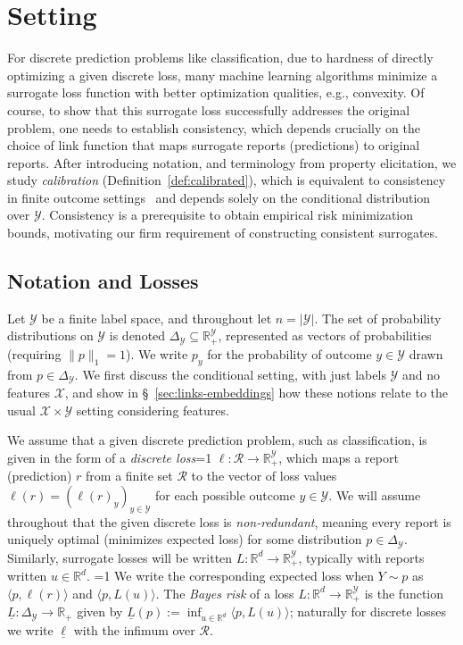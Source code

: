 \documentclass[12pt]{article}
\newcommand{\Comments}{1}
\newcommand{\mytodo}[2]{\ifnum\Comments=1%
  \todo[linecolor=#1!80!black,backgroundcolor=#1,bordercolor=#1!80!black]{#2}\fi}
\newcommand{\jessiet}[1]{\mytodo{teal!20!white}{JF: #1}}
\newcommand{\btw}[1]{\mytodo{gray!20!white}{BTW: #1}}%
\newcommand{\reals}{\mathbb{R}}
\newcommand{\simplex}{\Delta_\Y}
\newcommand{\R}{\mathcal{R}}
\newcommand{\X}{\mathcal{X}}
\newcommand{\Y}{\mathcal{Y}}
\newcommand{\risk}[1]{\underline{#1}}
\newcommand{\inprod}[2]{\langle #1, #2 \rangle}%
\begin{document}
\section{Setting}
\label{sec:setting}

For discrete prediction problems like classification, due to hardness of directly optimizing a given discrete loss, many machine learning algorithms minimize a surrogate loss function with better optimization qualities, e.g., convexity.
Of course, to show that this surrogate loss successfully addresses the original problem, one needs to establish consistency, which depends crucially on the choice of link function that maps surrogate reports (predictions) to original reports.
After introducing notation, and terminology from property elicitation, we study \emph{calibration} (Definition~\ref{def:calibrated}), which is equivalent to consistency in finite outcome settings~\citep{bartlett2006convexity,tewari2007consistency,ramaswamy2016convex} and depends solely on the conditional distribution over $\Y$.
Consistency is a prerequisite to obtain empirical risk minimization bounds, motivating our firm requirement of constructing consistent surrogates.

\subsection{Notation and Losses}
\label{sec:notation-losses}

Let $\Y$ be a finite label space, and throughout let $n=|\Y|$.
The set of probability distributions on $\Y$ is denoted $\simplex\subseteq\reals^{\Y}_+$, represented as vectors of probabilities (requiring $\|p\|_1 = 1$).
We write $p_y$ for the probability of outcome $y \in \Y$ drawn from $p \in \simplex$.
We first discuss the conditional setting, with just labels $\Y$ and no features $\X$, and show in \S~\ref{sec:links-embeddings} how these notions relate to the usual $\X\times\Y$ setting considering features.

We assume that a given discrete prediction problem, such as classification, is given in the form of a \emph{discrete loss}\jessiet{discrete vs target?} $\ell:\R\to\reals^\Y_+$, which maps a report (prediction) $r$ from a finite set $\R$ to the vector of loss values $\ell(r) = (\ell(r)_y)_{y\in\Y}$ for each possible outcome $y\in\Y$.
We will assume throughout that the given discrete loss is \emph{non-redundant}, meaning every report is uniquely optimal (minimizes expected loss) for some distribution $p\in\simplex$.
Similarly, surrogate losses will be written $L:\reals^d\to\reals^\Y_+$, typically with reports written $u\in\reals^d$.
\btw{Cut generic loss}%
We write the corresponding expected loss when $Y \sim p$ as $\inprod{p}{\ell(r)}$ and $\inprod{p}{L(u)}$.
The \emph{Bayes risk} of a loss $L:\reals^d\to\reals^\Y_+$ is the function $\risk{L}:\simplex\to\reals_+$ given by $\risk{L}(p) := \inf_{u\in\reals^d} \inprod{p}{L(u)}$; naturally for discrete losses we write $\risk{\ell}$ with the infimum over $\R$.
\end{document}
